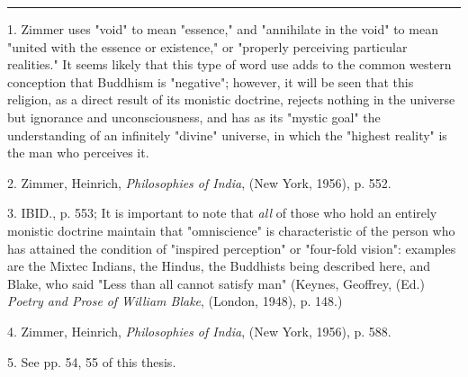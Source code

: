 \vspace*{\fill}
\noindent\rule{0.25\textwidth}{0.4pt}\par
1. Zimmer uses "void" to mean "essence," and "annihilate
in the void" to mean "united with the essence or existence,"
or "properly perceiving particular realities." It seems
likely that this type of word use adds to the common western
conception that Buddhism is "negative"; however, it will be
seen that this religion, as a direct result of its monistic
doctrine, rejects nothing in the universe but ignorance and
unconsciousness, and has as its "mystic goal" the understanding
of an infinitely "divine" universe, in which the "highest
reality" is the man who perceives it.\par
2. Zimmer, Heinrich, \textit{Philosophies of India}, (New York,
1956), p. 552.\par
3. IBID., p. 553; It is important to note that \textit{all} of those
who hold an entirely monistic doctrine maintain that
"omniscience" is characteristic of the person who has attained
the condition of "inspired perception" or "four-fold vision":
examples are the Mixtec Indians, the Hindus, the Buddhists
being described here, and Blake, who said "Less than all cannot
satisfy man" (Keynes, Geoffrey, (Ed.) \textit{Poetry and Prose}
\textit{of William Blake}, (London, 1948), p. 148.)\par
4. Zimmer, Heinrich, \textit{Philosophies of India}, (New York,
1956), p. 588.\par
5. See pp. 54, 55 of this thesis.\par

\newpage

{}

